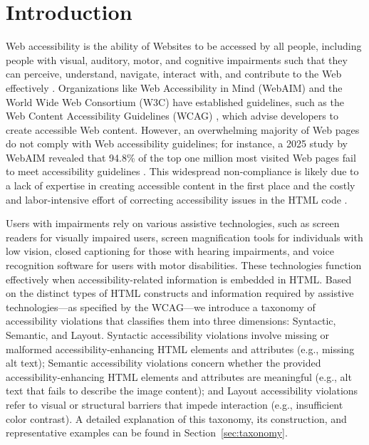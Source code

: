 \documentclass[sigconf, nonacm]{acmart}
\begin{document}




\maketitle

\section{Introduction} 
Web accessibility is the ability of Websites to be accessed by all people, including people with visual, auditory, motor, and cognitive impairments such that they can perceive, understand, navigate, interact with, and contribute to the Web effectively \cite{DBLP:conf/w4a/YesiladaBVH12, DBLP:conf/cscw/WuWFS17, rutter2007Web}. Organizations like Web Accessibility in Mind (WebAIM) and the World Wide Web Consortium (W3C) have established guidelines, such as the Web Content Accessibility Guidelines (WCAG) \cite{caldwell2008Web}, which advise developers to create accessible Web content. However, an overwhelming majority of Web pages do not comply with Web accessibility guidelines; for instance, a 2025 study by WebAIM revealed that 94.8\% of the top one million most visited Web pages fail to meet accessibility guidelines \cite{Webaim2025}. This widespread non-compliance is likely due to a lack of expertise in creating accessible content in the first place and the costly and labor-intensive effort of correcting accessibility issues in the HTML code \cite{DBLP:conf/icse/Alshayban0M20, DBLP:journals/tosem/BiXLGZF22}.
 
Users with impairments rely on various assistive technologies, such as screen readers for visually impaired users, screen magnification tools for individuals with low vision, closed captioning for those with hearing impairments, and voice recognition software for users with motor disabilities. These technologies function effectively when accessibility-related information is embedded in HTML. Based on the distinct types of HTML constructs and information required by assistive technologies—as specified by the WCAG—we introduce a taxonomy of accessibility violations that classifies them into three dimensions: Syntactic, Semantic, and Layout. Syntactic accessibility violations involve missing or malformed accessibility-enhancing HTML elements and attributes (e.g., missing alt text); Semantic accessibility violations concern whether the provided accessibility-enhancing HTML elements and attributes are meaningful (e.g., alt text that fails to describe the image content); and Layout accessibility violations refer to visual or structural barriers that impede interaction (e.g., insufficient color contrast). A detailed explanation of this taxonomy, its construction, and representative examples can be found in Section~\ref{sec:taxonomy}.
\end{document}
